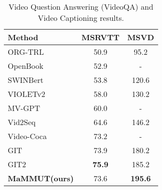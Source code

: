 \documentclass[10pt]{article} \usepackage[accepted]{tmlr}
\newcommand{\ours}{MaMMUT\xspace}
\begin{document}
\begin{table}[h]
\begin{subtable}[h]{0.4\textwidth}
\begin{tabular}{l|c|c}
        Method	&MSRVTT   & MSVD \\
        \hline
ORG-TRL~\citep{orgtrl} &50.9 &95.2  \\
        OpenBook~\citep{openbook} &52.9 &- \\
        SWINBert~\citep{swinbert} &53.8 &120.6 \\
        VIOLETv2~\citep{fu2023empiricalmvm} &58.0 &130.2  \\
        MV-GPT~\citep{mvgpt} &60.0 &- \\
        Vid2Seq~\citep{vid2seq} &64.6 & 146.2\\
        Video-Coca~\citep{videococa}	&73.2 & - \\
GIT~\citep{wang2022git} &73.9 &180.2 \\
        GIT2~\citep{wang2022git} &\textbf{75.9} &185.2 \\
\hline
        \textbf{\ours (ours)} 	&73.6 &\textbf{195.6} \\ 
        \hline
        \end{tabular}
        \vspace{2mm}
        \caption{\textbf{Video Captioning Results.} \ours performs well on both MSRVTT and MSVD Video Captioning Benchmarks, outperforming SOTA on MSVD by large margins. CIDEr scores are shown. As for VideoQA experiments, we use only image-language pre-training, and directly fine-tune the model on each dataset.}
        \label{tab:video_cap}
     \end{subtable}
     \caption{Video Question Answering (VideoQA) and Video Captioning results.}
     \vspace{-3mm}
     \label{tab:temps}
\end{table}
\end{document}
